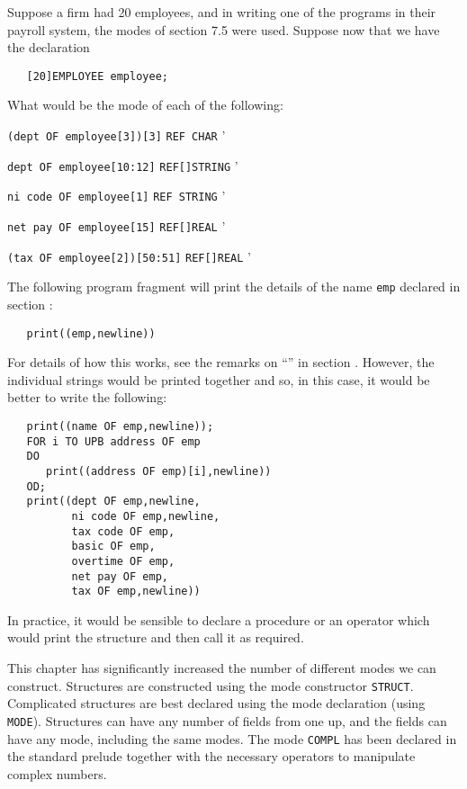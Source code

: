 \begin{exercise}
\item Suppose a firm had 20 employees, and in writing one of the
programs in their payroll system, the modes of section 7.5 were used.
Suppose now that we have the declaration
\begin{verbatim}
   [20]EMPLOYEE employee;
\end{verbatim}
\noindent
What would be the mode of each of the following:
\begin{subex}
\item \verb|(dept OF employee[3])[3]| \subans \verb|REF CHAR|
'
\item \verb|dept OF employee[10:12]| \subans \verb|REF[]STRING|
'
\item \verb|ni code OF employee[1]| \subans \verb|REF STRING|
'
\item \verb|net pay OF employee[15]| \subans \verb|REF[]REAL|
'
\item \verb|(tax OF employee[2])[50:51]| \subans \verb|REF[]REAL|
'
\end{subex}
\end{exercise}

The following program fragment will print the details of the name
\verb|emp| declared in section :
\begin{verbatim}
   print((emp,newline))
\end{verbatim}
\noindent
For details of how this works, see the remarks on
``'' in section . However,
the individual strings would be printed together and so, in this
case, it would be better to write the following:
\begin{verbatim}
   print((name OF emp,newline));
   FOR i TO UPB address OF emp
   DO
      print((address OF emp)[i],newline))
   OD;
   print((dept OF emp,newline,
          ni code OF emp,newline,
          tax code OF emp,
          basic OF emp,
          overtime OF emp,
          net pay OF emp,
          tax OF emp,newline))
\end{verbatim}
\noindent
In practice, it would be sensible to declare a procedure or an
operator which would print the structure and then call it as required.
\newpage

This chapter has significantly increased the number of different
modes we can construct.  Structures are constructed using the mode
constructor \verb|STRUCT|.  Complicated structures are best declared
using the mode declaration (using \verb|MODE|).  Structures can have
any number of fields from one up, and the fields can have any mode,
including the same modes.  The mode \verb|COMPL| has been declared in
the standard prelude together with the necessary operators to
manipulate complex numbers.

